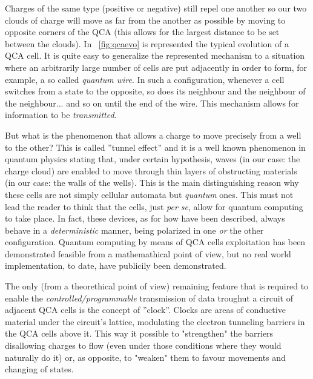 Charges of the same type (positive or negative) still repel one another so our two clouds of charge will move as far from the another as possible by moving to opposite corners of the QCA (this allows for the largest distance to be set between the clouds). In \figurename~\ref{fig:qcaevo} is represented the typical evolution of a QCA cell. It is quite easy to generalize the represented mechanism to a situation where an arbitrarily large number of cells are put adjacently in order to form, for example, a so called \textsl{quantum wire}. In such a configuration, whenever a cell switches from a state to the opposite, so does its neighbour and the neighbour of the neighbour... and so on until the end of the wire. This mechanism allows for information to be \textsl{transmitted}.

But what is the phenomenon that allows a charge to move precisely from a well to the other? This is called ''tunnel effect'' and it is a well known phenomenon in quantum physics stating that, under certain hypothesis, waves (in our case: the charge cloud) are enabled to move through thin layers of obstructing materials (in our case: the walls of the wells). This is the main distinguishing reason why these cells are not simply cellular automata but \textsl{quantum} ones. This must not lead the reader to think that the cells, just \textsl{per se}, allow for quantum computing to take place. In fact, these devices, as for how have been described, always behave in a \textsl{deterministic} manner, being polarized in one \textsl{or} the other configuration. Quantum computing by means of QCA cells exploitation has been demonstrated feasible from a mathemathical point of view, but no real world implementation, to date, have publicily been demonstrated.  

The only (from a theorethical point of view) remaining feature that is required to enable the \textsl{controlled/programmable} transmission of data troughut a circuit of adjacent QCA cells is the concept of ''clock''. Clocks are areas of conductive material under the circuit's lattice, modulating the electron tunneling barriers in the QCA cells above it. This way it possible to "strengthen" the barriers disallowing charges to flow (even under those conditions where they would naturally do it) or, as opposite, to "weaken" them to favour movements and changing of states.

